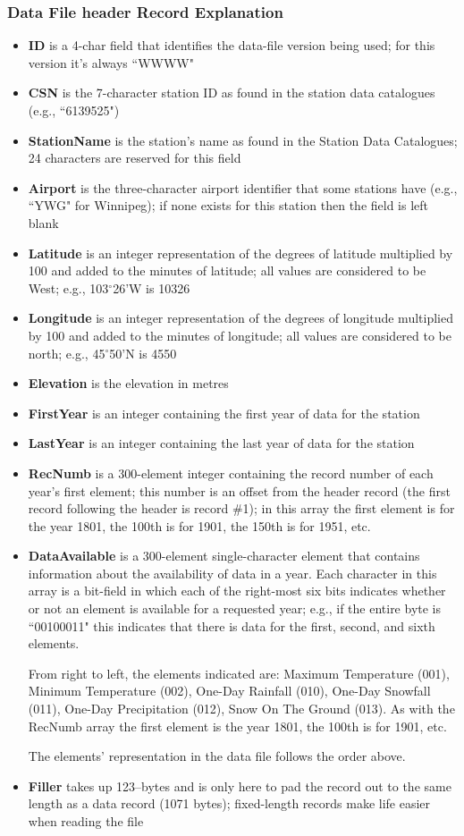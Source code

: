 \documentclass[12pt]{article}
\begin{document}
\subsubsection{Data File header Record Explanation}
\begin{itemize}
\item \textbf{ID} is a 4-char field that identifies the data-file version being used; for this version it's always ``WWWW"
\item \textbf{CSN} is the 7-character station ID as found in the station data catalogues (e.g., ``6139525")
\item \textbf{StationName} is the station's name as found in the Station Data Catalogues; 24 characters are reserved for this field
\item \textbf{Airport} is the three-character airport identifier that some stations have (e.g., ``YWG" for Winnipeg); if none exists for this station then the field is left blank
\item \textbf{Latitude} is an integer representation of the degrees of latitude multiplied by 100 and added to the minutes of latitude; all values are considered to be West; e.g., 103$^\circ$26'W is 10326
\item \textbf{Longitude} is an integer representation of the degrees of longitude multiplied by 100 and added to the minutes of longitude; all values are considered to be north; e.g., 45$^\circ$50'N is 4550
\item \textbf{Elevation} is the elevation in metres
\item \textbf{FirstYear} is an integer containing the first year of data for the station
\item \textbf{LastYear} is an integer containing the last year of data for the station
\item \textbf{RecNumb} is a 300-element integer containing the record number of each year's first element; this number is an offset from the header record (the first record following the header is record \#1); in this array the first element is for the year 1801, the 100th is for 1901, the 150th is for 1951, etc.
\item \textbf{DataAvailable} is a 300-element single-character element that contains information about the availability of data in a year. Each character in this array is a bit-field in which each of the right-most six bits indicates whether or not an element is available for a requested year; e.g., if the entire byte is ``00100011" this indicates that there is data for the first, second, and sixth elements.

From right to left, the elements indicated are:  Maximum Temperature (001), Minimum Temperature (002), One-Day Rainfall (010), One-Day Snowfall (011), One-Day Precipitation (012), Snow On The Ground (013).  As with the RecNumb array the first element is the year 1801, the 100th is for 1901, etc.

The elements' representation in the data file follows the order above.
\item \textbf{Filler} takes up 123--bytes and is only here to pad the record out to the same length as a data record (1071 bytes); fixed-length records make life easier when reading the file
\end{itemize}
\end{document}
